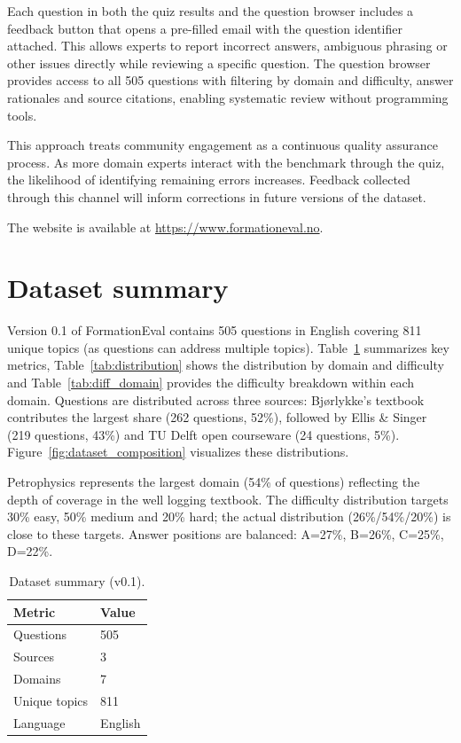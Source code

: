 \documentclass[11pt]{article}
\begin{document}
Each question in both the quiz results and the question browser includes a feedback button that opens a pre-filled email with the question identifier attached. This allows experts to report incorrect answers, ambiguous phrasing or other issues directly while reviewing a specific question. The question browser provides access to all 505 questions with filtering by domain and difficulty, answer rationales and source citations, enabling systematic review without programming tools.

This approach treats community engagement as a continuous quality assurance process. As more domain experts interact with the benchmark through the quiz, the likelihood of identifying remaining errors increases. Feedback collected through this channel will inform corrections in future versions of the dataset.

The website is available at \url{https://www.formationeval.no}.

\section{Dataset summary}

Version 0.1 of FormationEval contains 505 questions in English covering 811 unique topics (as questions can address multiple topics). Table~\ref{tab:summary} summarizes key metrics, Table~\ref{tab:distribution} shows the distribution by domain and difficulty and Table~\ref{tab:diff_domain} provides the difficulty breakdown within each domain. Questions are distributed across three sources: Bj{\o}rlykke's textbook contributes the largest share (262 questions, 52\%), followed by Ellis \& Singer (219 questions, 43\%) and TU Delft open courseware (24 questions, 5\%). Figure~\ref{fig:dataset_composition} visualizes these distributions.

Petrophysics represents the largest domain (54\% of questions) reflecting the depth of coverage in the well logging textbook. The difficulty distribution targets 30\% easy, 50\% medium and 20\% hard; the actual distribution (26\%/54\%/20\%) is close to these targets. Answer positions are balanced: A=27\%, B=26\%, C=25\%, D=22\%.

\begin{table}[htbp]
  \centering
  \caption{Dataset summary (v0.1).}
  \label{tab:summary}
  \begin{tabular}{ll}
    \toprule
    Metric & Value \\
    \midrule
    Questions & 505 \\
    Sources & 3 \\
    Domains & 7 \\
    Unique topics & 811 \\
    Language & English \\
    \bottomrule
  \end{tabular}
\end{table}
\end{document}

